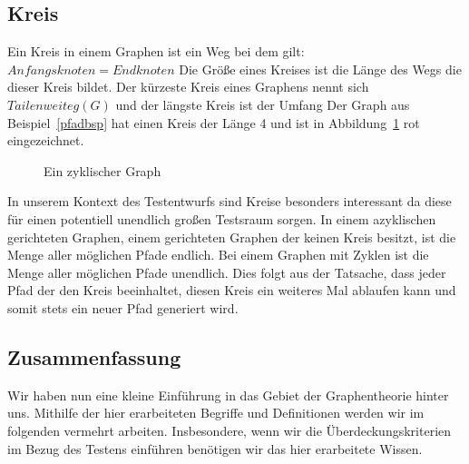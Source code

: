 \subsection{Kreis}

Ein Kreis in einem Graphen ist ein Weg bei dem gilt: $Anfangsknoten = Endknoten$ \cite[vgl. S. 8]{graphentheorie}
Die Größe eines Kreises ist die Länge des Wegs die dieser Kreis bildet.
Der kürzeste Kreis eines Graphens nennt sich $Tailenweite g(G)$ und der längste Kreis ist der Umfang \cite[vgl. S.8]{graphentheorie}
Der Graph aus Beispiel~\ref{pfadbsp} hat einen Kreis der Länge 4 und ist in Abbildung~\ref{zyklgraph} rot eingezeichnet.

\begin{figure}[h!]
    \centering
    \label{zyklgraph}
    \caption{Ein zyklischer Graph}
\end{figure}
In unserem Kontext des Testentwurfs sind Kreise besonders interessant da diese für einen potentiell unendlich großen Testsraum sorgen.
In einem azyklischen gerichteten Graphen, einem gerichteten Graphen der keinen Kreis besitzt, ist die Menge aller möglichen Pfade endlich.
Bei einem Graphen mit Zyklen ist die Menge aller möglichen Pfade unendlich.
Dies folgt aus der Tatsache, dass jeder Pfad der den Kreis beeinhaltet, diesen Kreis ein weiteres Mal ablaufen kann
und somit stets ein neuer Pfad generiert wird.

\subsection{Zusammenfassung}
Wir haben nun eine kleine Einführung in das Gebiet der Graphentheorie hinter uns.
Mithilfe der hier erarbeiteten Begriffe und Definitionen werden wir im folgenden vermehrt arbeiten.
Insbesondere, wenn wir die Überdeckungskriterien im Bezug des Testens einführen benötigen wir das hier erarbeitete Wissen.

\newpage